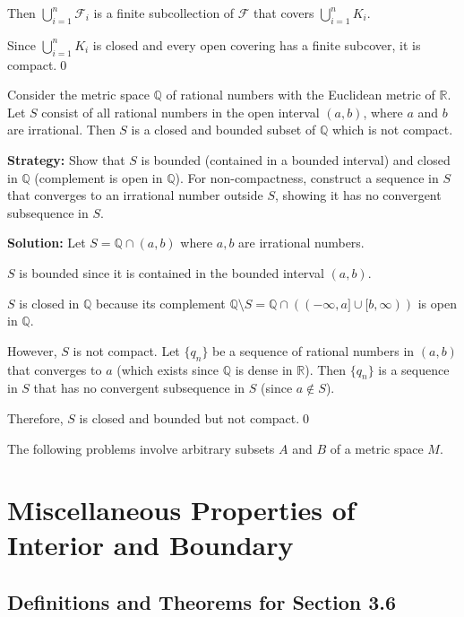 Then $\bigcup_{i=1}^n \mathcal{F}_i$ is a finite subcollection of $\mathcal{F}$ that covers $\bigcup_{i=1}^n K_i$.

Since $\bigcup_{i=1}^n K_i$ is closed and every open covering has a finite subcover, it is compact.\qed


\begin{problembox}
Consider the metric space \( \mathbb{Q} \) of rational numbers with the Euclidean metric of \( \mathbb{R} \). Let \( S \) consist of all rational numbers in the open interval \((a, b)\), where \( a \) and \( b \) are irrational. Then \( S \) is a closed and bounded subset of \( \mathbb{Q} \) which is not compact.
\end{problembox}

\noindent\textbf{Strategy:} Show that $S$ is bounded (contained in a bounded interval) and closed in $\mathbb{Q}$ (complement is open in $\mathbb{Q}$). For non-compactness, construct a sequence in $S$ that converges to an irrational number outside $S$, showing it has no convergent subsequence in $S$.

\bigskip\noindent\textbf{Solution:} Let $S = \mathbb{Q} \cap (a,b)$ where $a, b$ are irrational numbers.

$S$ is bounded since it is contained in the bounded interval $(a,b)$.

$S$ is closed in $\mathbb{Q}$ because its complement $\mathbb{Q} \setminus S = \mathbb{Q} \cap ((-\infty,a] \cup [b,\infty))$ is open in $\mathbb{Q}$.

However, $S$ is not compact. Let $\{q_n\}$ be a sequence of rational numbers in $(a,b)$ that converges to $a$ (which exists since $\mathbb{Q}$ is dense in $\mathbb{R}$). Then $\{q_n\}$ is a sequence in $S$ that has no convergent subsequence in $S$ (since $a \notin S$).

Therefore, $S$ is closed and bounded but not compact.\qed


\begin{problembox}
The following problems involve arbitrary subsets \( A \) and \( B \) of a metric space \( M \).
\end{problembox}

\section{Miscellaneous Properties of Interior and Boundary}

\subsection*{Definitions and Theorems for Section 3.6}

